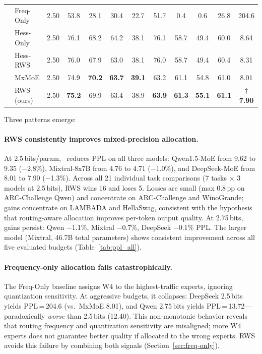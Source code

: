 \begin{table}[!t]
\begin{tabular}{llcccccccccc}
\cmidrule(lr){2-12}
                      & Freq-Only   & 2.50 & 53.8 & 28.1 & 30.4 & 22.7 & 51.7 &  0.4 &  0.6 & 26.8 & 204.6 \\
                      & Hess-Only   & 2.50 & 76.1 & 68.2 & 64.2 & 38.1 & 76.1 & 58.7 & 49.4 & 60.0 &   8.64 \\
                      & Hess-RWS    & 2.50 & 76.0 & 67.9 & 63.0 & 38.1 & 76.0 & 58.7 & 49.4 & 60.4 &   8.31 \\
                      & MxMoE       & 2.50 & 74.9 & \textbf{70.2} & \textbf{63.7} & \textbf{39.1} & 63.2 & 61.1 & 54.8 & 61.0 &   8.01 \\
                      & RWS (ours)  & 2.50 & \textbf{75.2} & 69.9 & 63.4 & 38.9 & \textbf{63.9} & \textbf{61.3} & \textbf{55.1} & \textbf{61.1} & $\dagger$\textbf{7.90} \\
\bottomrule
\end{tabular}
\end{table}
\FloatBarrier

Three patterns emerge:

\paragraph{RWS consistently improves mixed-precision allocation.}
At 2.5\,bits/param, \method\ reduces PPL on all three models: Qwen1.5-MoE from 9.62 to 9.35 ($-$2.8\%), Mixtral-8x7B from 4.76 to 4.71 ($-$1.0\%), and DeepSeek-MoE from 8.01 to 7.90 ($-$1.3\%). Across all 21 individual task comparisons (7 tasks $\times$ 3 models at 2.5\,bits), RWS wins 16 and loses 5. Losses are small (max 0.8\,pp on ARC-Challenge Qwen) and concentrate on ARC-Challenge and WinoGrande; gains concentrate on LAMBADA and HellaSwag, consistent with the hypothesis that routing-aware allocation improves per-token output quality. At 2.75\,bits, gains persist: Qwen $-$1.1\%, Mixtral $-$0.7\%, DeepSeek $-$0.1\% PPL. The larger model (Mixtral, 46.7B total parameters) shows consistent improvement across all five evaluated budgets (Table~\ref{tab:ppl_all}).

\paragraph{Frequency-only allocation fails catastrophically.}
The Freq-Only baseline assigns W4 to the highest-traffic experts, ignoring quantization sensitivity. At aggressive budgets, it collapses: DeepSeek 2.5\,bits yields PPL\,=\,204.6 (vs.\ MxMoE 8.01), and Qwen 2.75\,bits yields PPL\,=\,13.72---paradoxically \emph{worse} than 2.5\,bits (12.40). This non-monotonic behavior reveals that routing frequency and quantization sensitivity are misaligned; more W4 experts does not guarantee better quality if allocated to the wrong experts. RWS avoids this failure by combining both signals (Section~\ref{sec:freq-only}).

